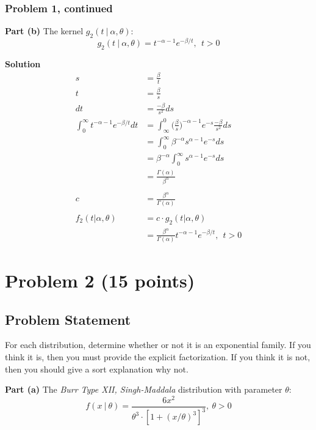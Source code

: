 \documentclass[12pt]{article}
\theoremstyle{definition}
\begin{document}
\newpage
\subsubsection*{Problem 1, continued}

\vspace{0.5in}
\noindent
{\bf Part (b)} The kernel $g_2(t\ |\ \alpha, \theta)$:
$$
g_2(t\ |\ \alpha, \theta) = t^{-\alpha-1} e^{-\beta/t},\ \ t > 0
$$

\bigskip
\noindent
{\bf Solution} 
\begin{align*}
s &= \frac{\beta}{t}\\
t &= \frac{\beta}{s}\\
dt &= \frac{{-\beta}}{s^2}ds\\
\int_0^\infty t^{-\alpha-1} e^{-\beta/t} dt &= \int_\infty^0 \biggr(\frac{\beta}{s}\biggr)^{-\alpha - 1} e^{-s} \frac{{-\beta}}{s^2}ds\\
&= \int_0^\infty \beta^{-\alpha} s^{\alpha - 1}e^{-s}ds\\
&= \beta^{-\alpha} \int_0^\infty s^{\alpha - 1} e^{-s}ds\\
&= \frac{\Gamma(\alpha)}{\beta^\alpha}\\\\
c &= \frac{\beta^\alpha}{\Gamma(\alpha)}\\\\
f_2(t|\alpha, \theta) &= c\cdot g_2(t|\alpha, \theta)\\
&= \frac{\beta^\alpha}{\Gamma(\alpha)} t^{-\alpha-1} e^{-\beta/t},\ \ t > 0
\end{align*}





\newpage
\section*{Problem 2 (15 points)}

\subsection*{Problem Statement}

For each distribution, determine whether or not it is an exponential family. If you think it is, then you must provide the explicit factorization. If you think it is not, then you should give a sort explanation why not.

\bigskip
\noindent
{\bf Part (a)} The {\em Burr Type XII, Singh-Maddala} distribution with parameter $\theta$:
$$
f(x\ |\ \theta) = \frac{ 6 x^2 }{\theta^3 \cdot [1 + (x/\theta)^3]^3},\ \theta > 0
$$
\end{document}
